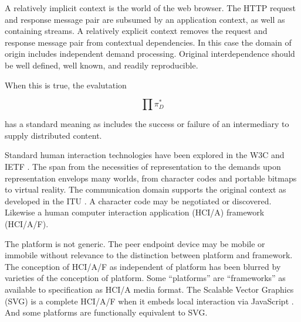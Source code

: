 \documentclass[12pt,twocolumn]{article}
\begin{document}
A relatively implicit context is the world of the web browser.  The
HTTP \cite{RFC2616} request and response message pair are subsumed by
an application context, as well as containing streams.  A relatively
explicit context removes the request and response message pair from
contextual dependencies.  In this case the domain of origin includes
independent demand processing.  Original interdependence should be
well defined, well known, and readily reproducible.

When this is true, the evalutation

$$
 \prod \pi^{*}_{D}
$$

has a standard meaning as includes the success or failure of an
intermediary to supply distributed content.

Standard human interaction technologies have been explored in the W3C
\cite{HTML} and IETF \cite{RFC2045}.  The span from the necessities of
representation to the demands upon representation envelops many
worlds, from character codes and portable bitmaps to virtual reality.
The communication domain supports the original context as developed in
the ITU \cite{X400}.  A character code may be negotiated or
discovered.  Likewise a human computer interaction application (HCI/A)
framework (HCI/A/F).

The platform is not generic.  The peer endpoint device may be mobile
or immobile without relevance to the distinction between platform and
framework.  The conception of HCI/A/F as independent of platform has
been blurred by varieties of the conception of platform.  Some
``platforms'' are ``frameworks'' as available to specification as
HCI/A media format.  The Scalable Vector Graphics (SVG) \cite{SVG} is
a complete HCI/A/F when it embeds local interaction via JavaScript
\cite{JS}.  And some platforms are functionally equivalent to SVG.

\appendix



\end{document}
